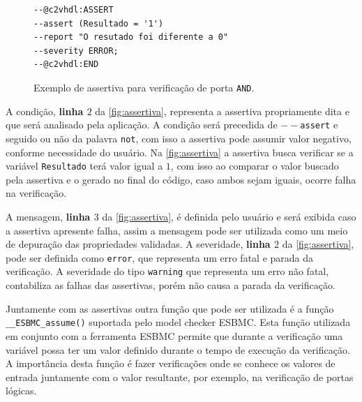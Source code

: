 \begin{figure}[H]
\caption{\label{fig:assertiva} Exemplo de assertiva para verificação de porta \texttt{AND}.}
	\begin{center}
    \begin{minipage}{0.99\textwidth}
    \begin{lstlisting}       
--@c2vhdl:ASSERT
--assert (Resultado = '1')
--report "O resutado foi diferente a 0"
--severity ERROR;
--@c2vhdl:END
    \end{lstlisting}
    \end{minipage}
	\end{center}
\end{figure}

\par
A condição, \textbf{linha $2$} da \autoref{fig:assertiva}, representa a assertiva propriamente dita e que será analisado pela aplicação. A condição será precedida de \texttt{$--$assert} e seguido ou não da palavra \texttt{not}, com isso a assertiva pode assumir valor negativo, conforme necessidade do usuário. Na \autoref{fig:assertiva} a assertiva busca verificar se a variável \texttt{Resultado} terá valor igual a $1$, com isso ao comparar o valor buscado pela assertiva e o gerado no final do código, caso ambos sejam iguais, ocorre falha na verificação. 

\par
A mensagem, \textbf{linha $3$} da \autoref{fig:assertiva}, é definida pelo usuário e será exibida caso a assertiva apresente falha, assim a mensagem pode ser utilizada como um meio de depuração das propriedades validadas. A severidade, \textbf{linha $2$} da \autoref{fig:assertiva}, pode ser definida como \texttt{error}, que representa um erro fatal e parada da verificação. A severidade do tipo \texttt{warning} que representa um erro não fatal, contabiliza as falhas das assertivas, porém não causa a parada da verificação.

\par
Juntamente com as assertivas outra função que pode ser utilizada é a função \texttt{\_\_ESBMC\allowbreak{}\_assume()} suportada pelo model checker ESBMC. Esta função utilizada em conjunto com a ferramenta ESBMC permite que durante a verificação uma variável possa ter um valor definido durante o tempo de execução da verificação. A importância desta função é fazer verificações onde se conhece os valores de entrada juntamente com o valor resultante, por exemplo, na verificação de portas lógicas.

